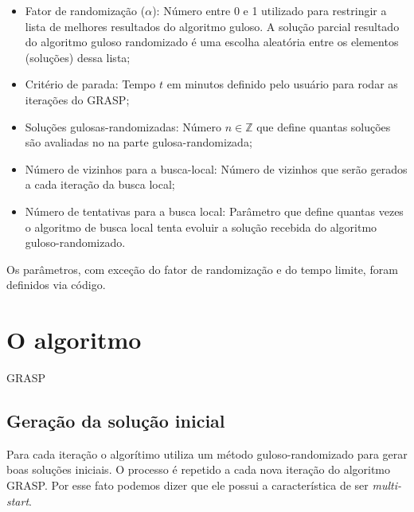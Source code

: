 \documentclass[12pt]{article}
\begin{document}
\begin{itemize}
\item Fator de randomização ($\alpha $): Número entre 0 e 1 utilizado para restringir a lista de melhores resultados do algoritmo guloso. A solução parcial resultado do algoritmo guloso randomizado é uma escolha aleatória entre os elementos (soluções) dessa lista;
\item Critério de parada: Tempo $t$ em minutos definido pelo usuário para rodar as iterações do GRASP;
\item Soluções gulosas-randomizadas: Número $n \in \mathbb{Z} $ que define quantas soluções são avaliadas no na parte gulosa-randomizada;
\item Número de vizinhos para a busca-local: Número de vizinhos que serão gerados a cada iteração da busca local;
\item Número de tentativas para a busca local: Parâmetro que define quantas vezes o algoritmo de busca local tenta evoluir a solução recebida do algoritmo guloso-randomizado. 
\end{itemize}

Os parâmetros, com exceção do fator de randomização e do tempo limite, foram definidos via código. 



\section{O algoritmo}

\begin{algorithm}[H]
   \SetAlgoLined
   \label{alg1}
   \caption{\textsc{GRASP}}
 \end{algorithm}

\subsection{Geração da solução inicial} Para cada iteração o algorítimo utiliza um método guloso-randomizado para gerar boas soluções iniciais. O processo é repetido a cada nova iteração do algoritmo GRASP. Por esse fato podemos dizer que ele possui a característica de ser \textit{multi-start}. 
\end{document}
